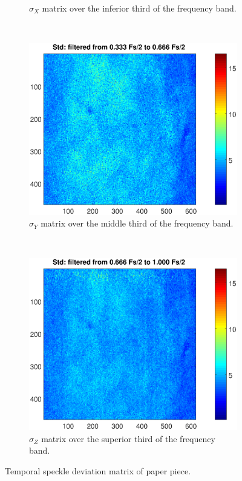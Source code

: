 \documentclass[review]{elsarticle}
\begin{document}
\begin{figure}[h!]
\begin{subfigure}[b]{0.465\textwidth}
	\caption{$\sigma_X$ matrix over the inferior third of the frequency band.}
        \label{fig:papelstd_stdx}
    \end{subfigure}
    ~\\ 
    \begin{subfigure}[b]{0.475\textwidth}
        \includegraphics[width=\textwidth]{stdy.eps}
	\caption{$\sigma_Y$ matrix over the middle third of the frequency band.}
        \label{fig:papelstd_stdy}
    \end{subfigure}
  ~
    \begin{subfigure}[b]{0.475\textwidth}
        \includegraphics[width=\textwidth]{stdz.eps}
	\caption{$\sigma_Z$ matrix over the superior third of the frequency band.}
        \label{fig:papelstd_stdz}
    \end{subfigure}
    
    \caption{Temporal speckle deviation matrix of paper piece.}
    \label{fig:papelstd}
\end{figure}
\end{document}
